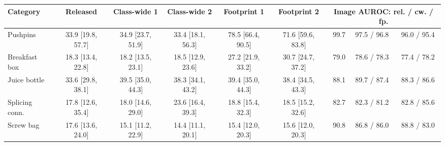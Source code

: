 \begin{tabular}{lcccccrcc}
\toprule
Category & Released & Class-wide 1 & Class-wide 2 & Footprint 1 & Footprint 2 & \multicolumn{3}{c}{Image AUROC: rel. / cw. / fp.} \\
\midrule
Pushpins & 33.9 [19.8, 57.7] & 34.9 [23.7, 51.9] & 33.4 [18.1, 56.3] & 78.5 [66.4, 90.5] & 71.6 [59.6, 83.8] & 99.7 & 97.5 / 96.8 & 96.0 / 95.4 \\
Breakfast box & 18.3 [13.4, 22.8] & 18.2 [13.5, 23.1] & 18.5 [12.9, 23.6] & 27.2 [21.9, 33.2] & 30.7 [24.7, 37.2] & 79.0 & 78.6 / 78.3 & 77.4 / 78.2 \\
Juice bottle & 33.6 [29.8, 38.1] & 39.5 [35.0, 44.3] & 38.3 [34.1, 43.2] & 39.4 [35.0, 44.3] & 38.4 [34.5, 43.3] & 88.1 & 89.7 / 87.4 & 88.3 / 86.6 \\
Splicing conn. & 17.8 [12.6, 35.4] & 18.0 [14.6, 29.0] & 23.6 [16.4, 39.3] & 18.8 [15.4, 32.3] & 18.5 [15.2, 32.6] & 82.7 & 82.3 / 81.2 & 82.8 / 85.6 \\
Screw bag & 17.6 [13.6, 24.0] & 15.1 [11.2, 22.9] & 14.4 [11.1, 20.1] & 15.4 [12.0, 20.3] & 15.6 [12.0, 20.3] & 90.8 & 86.8 / 86.0 & 88.8 / 83.0 \\
\bottomrule
\end{tabular}
